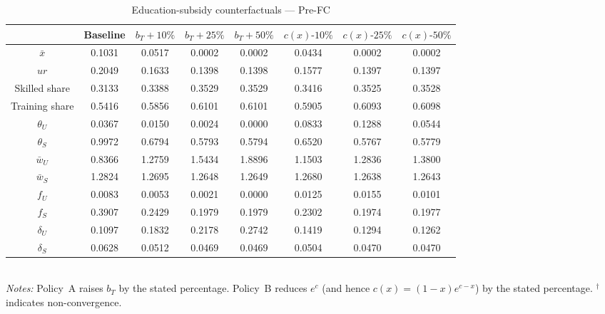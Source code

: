 \begin{table}[htbp]
\centering
\caption{Education-subsidy counterfactuals — Pre-FC}
\label{tab:educ_pre-fc}
\small
\begin{tabular}{c c c c c c c c}
\toprule
  & Baseline & $b_T +10\%$ & $b_T +25\%$ & $b_T +50\%$ & $c(x) \text{-}10\%$ & $c(x) \text{-}25\%$ & $c(x) \text{-}50\%$ \\
\midrule
\(\bar{x}\) & 0.1031 & 0.0517 & 0.0002 & 0.0002 & 0.0434 & 0.0002 & 0.0002 \\
\(ur\) & 0.2049 & 0.1633 & 0.1398 & 0.1398 & 0.1577 & 0.1397 & 0.1397 \\
Skilled share & 0.3133 & 0.3388 & 0.3529 & 0.3529 & 0.3416 & 0.3525 & 0.3528 \\
Training share & 0.5416 & 0.5856 & 0.6101 & 0.6101 & 0.5905 & 0.6093 & 0.6098 \\
\(\theta_U\) & 0.0367 & 0.0150 & 0.0024 & 0.0000 & 0.0833 & 0.1288 & 0.0544 \\
\(\theta_S\) & 0.9972 & 0.6794 & 0.5793 & 0.5794 & 0.6520 & 0.5767 & 0.5779 \\
\(\bar{w}_U\) & 0.8366 & 1.2759 & 1.5434 & 1.8896 & 1.1503 & 1.2836 & 1.3800 \\
\(\bar{w}_S\) & 1.2824 & 1.2695 & 1.2648 & 1.2649 & 1.2680 & 1.2638 & 1.2643 \\
\(f_U\) & 0.0083 & 0.0053 & 0.0021 & 0.0000 & 0.0125 & 0.0155 & 0.0101 \\
\(f_S\) & 0.3907 & 0.2429 & 0.1979 & 0.1979 & 0.2302 & 0.1974 & 0.1977 \\
\(\delta_U\) & 0.1097 & 0.1832 & 0.2178 & 0.2742 & 0.1419 & 0.1294 & 0.1262 \\
\(\delta_S\) & 0.0628 & 0.0512 & 0.0469 & 0.0469 & 0.0504 & 0.0470 & 0.0470 \\
\bottomrule
\end{tabular}
\\[2pt]
\footnotesize
\textit{Notes:} Policy~A raises \(b_T\) by the stated percentage. Policy~B reduces \(e^c\) (and hence \(c(x) = (1-x)e^{c-x}\)) by the stated percentage. \(^{\dagger}\) indicates non-convergence.
\end{table}
